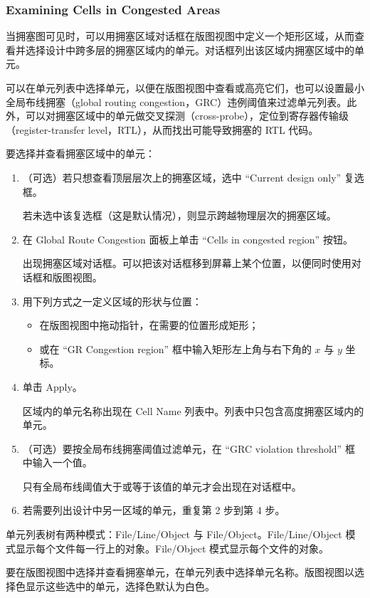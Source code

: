 \subsubsection*{Examining Cells in Congested Areas}

当拥塞图可见时，可以用拥塞区域对话框在版图视图中定义一个矩形区域，从而查看并选择设计中跨多层的拥塞区域内的单元。对话框列出该区域内拥塞区域中的单元。

可以在单元列表中选择单元，以便在版图视图中查看或高亮它们，也可以设置最小全局布线拥塞（global routing congestion，GRC）违例阈值来过滤单元列表。此外，可以对拥塞区域中的单元做交叉探测（cross-probe），定位到寄存器传输级（register-transfer level，RTL），从而找出可能导致拥塞的 RTL 代码。

要选择并查看拥塞区域中的单元：
\begin{enumerate}
  \item （可选）若只想查看顶层层次上的拥塞区域，选中 “Current design only” 复选框。

  若未选中该复选框（这是默认情况），则显示跨越物理层次的拥塞区域。
  \item 在 Global Route Congestion 面板上单击 “Cells in congested region” 按钮。

  出现拥塞区域对话框。可以把该对话框移到屏幕上某个位置，以便同时使用对话框和版图视图。
  \item 用下列方式之一定义区域的形状与位置：
  \begin{itemize}
    \item 在版图视图中拖动指针，在需要的位置形成矩形；
    \item 或在 “GR Congestion region” 框中输入矩形左上角与右下角的 $x$ 与 $y$ 坐标。
  \end{itemize}
  \item 单击 Apply。

  区域内的单元名称出现在 Cell Name 列表中。列表中只包含高度拥塞区域内的单元。
  \item （可选）要按全局布线拥塞阈值过滤单元，在 “GRC violation threshold” 框中输入一个值。

  只有全局布线阈值大于或等于该值的单元才会出现在对话框中。
  \item 若需要列出设计中另一区域的单元，重复第 2 步到第 4 步。
\end{enumerate}

单元列表树有两种模式：File/Line/Object 与 File/Object。File/Line/Object 模式显示每个文件每一行上的对象。File/Object 模式显示每个文件的对象。

要在版图视图中选择并查看拥塞单元，在单元列表中选择单元名称。版图视图以选择色显示这些选中的单元，选择色默认为白色。

